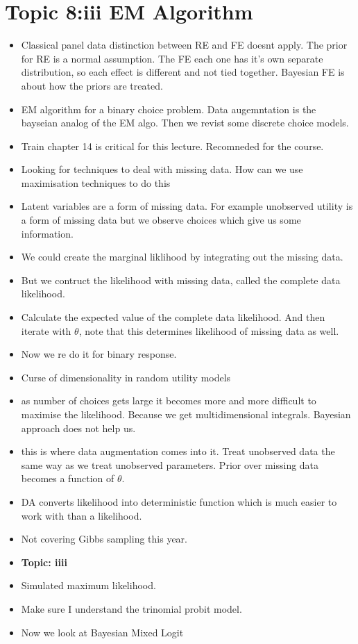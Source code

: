 \documentclass[12pt]{article}
\begin{document}
\section*{Topic 8:iii EM Algorithm}
\begin{itemize}
      \item Classical panel data distinction between RE and FE doesnt apply. The prior
            for RE is a normal assumption. The FE each one has it's own separate distribution, so each effect
            is different and not tied together. Bayesian FE is about how the priors are treated.

      \item EM algorithm for a binary choice problem. Data augemntation is the bayseian analog of the
            EM algo. Then we revist some discrete choice models.

      \item Train chapter 14 is critical for this lecture. Recomneded for the course.
      \item Looking for techniques to deal with missing data. How can we use maximisation techniques to do this
      \item Latent variables are a form of missing data. For example unobserved utility is a form of missing data but
            we observe choices which give us some information.

      \item We could create the marginal liklihood by integrating out the missing data.
      \item But we contruct the likelihood with missing data, called the complete data likelihood.

      \item Calculate the expected value of the complete data likelihood. And then iterate
            with $\theta$, note that this determines likelihood of missing data as well.

      \item Now we re do it for binary response.
      \item Curse of dimensionality in random utility models
      \item as number of choices gets large it becomes more and more difficult to maximise
            the likelihood. Because we get multidimensional integrals. Bayesian approach does not help us.

      \item this is where data augmentation comes into it. Treat unobserved data the same way as we treat
            unobserved parameters. Prior over missing data becomes a function of $\theta$.
      \item DA converts likelihood into deterministic function which is much easier to work with than a
            likelihood.

      \item Not covering Gibbs sampling this year.
      \item \textbf{Topic: iiii}
      \item Simulated maximum likelihood.
      \item Make sure I understand the trinomial probit model.
      \item Now we look at Bayesian Mixed Logit
\end{itemize}
\end{document}
